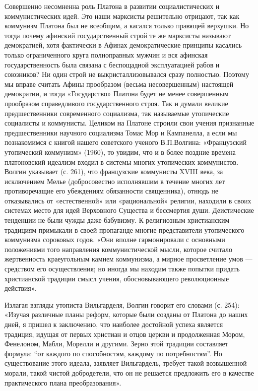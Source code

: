 Совершенно  несомненна  роль  Платона в  развитии  социалистических  и
коммунистических идей. Это наши марксисты решительно отрицают, так как
коммунизм Платона был не всеобщим, а касался только правящей верхушки.
Но  тогда  почему  афинский  государственный  строй  те  же  марксисты
называют  демократией,   хотя  фактически  в   Афинах  демократические
принципы касались только ограниченного круга полноправных мужчин и вся
афинская  государственность была  связана с  беспощадной эксплуатацией
рабов  и  союзников?  Ни  один  строй  не  выкристаллизовывался  сразу
полностью.  Поэтому   мы  вправе  считать  Афины   прообразом  (весьма
несовершенным)  настоящей демократии,  и  тогда «Государство»  Платона
будет не  менее совершенным прообразом  справедливого государственного
строя. Так  и думали великие предшественники  современного социализма,
так называемые утопические социалисты и коммунисты. Целиком на Платоне
строили  свои учения  признанные  предшественники научного  социализма
Томас  Мор  и Кампанелла,  а  если  мы  познакомимся с  книгой  нашего
советского  ученого В.П.Волгина:  «Французский утопический  коммунизм»
(1960), то увидим, что и в более поздние времена платоновский идеализм
входил  в системы  многих  утопических  коммунистов. Волгин  указывает
(с.  261),  что  французские  коммунисты XVIII  века,  за  исключением
Мелье (добросовестно  исполнявшим в течение многих  лет противоречащие
его  убеждениям обязанности  священника),  отнюдь  не отказывались  от
«естественной» или  «рациональной» религии, находили в  своих системах
место  для идей  Верховного Существа  и бессмертия  души. Деистические
тенденции  не были  чужды даже  бабувизму. К  религиозным христианским
традициям   примыкали   в   своей  пропаганде   многие   представители
утопического  коммунизма сороковых  годов.  «Они вполне  гармонировали
с  основными  положениями  того  направления  коммунистической  мысли,
которое считало жертвенность краеугольным  камнем коммунизма, а мирное
просветление  умов  ---  средством  его осуществления;  но  иногда  мы
находим  также попытки  придать  христианской  традиции смысл  учения,
обосновывающего революционные действия».

Излагая взгляды  утописта Вильгарделя, Волгин говорит  его словами (с.
254): «Изучая различные планы реформ,  которые были созданы от Платона
до наших  дней, я пришел  к заключению, что наиболее  достойной успеха
является  традиция,  идущая  от  первых  христиан  и  отцов  церкви  и
продолженная Мором,  Фенелоном, Мабли,  Морелли и другими.  Зерно этой
традиции составляет формула: ``от  каждого по способностям, каждому по
потребностям''. Но  существование этого идеала,  заявляет Вильгардель,
требует  такой  возвышенной  морали,  такой  чистой  добродетели,  что
он  не   решается  предложить  его  в   качестве  практического  плана
преобразования».

